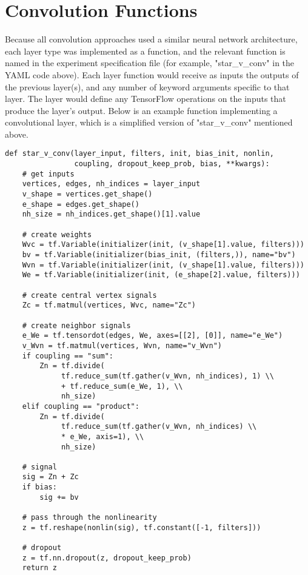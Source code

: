 \section{Convolution Functions}

Because all convolution approaches used a similar neural network architecture, each layer type was implemented as a function, and the relevant function is named in the experiment specification file (for example, "star\_v\_conv" in the YAML code above).
Each layer function would receive as inputs the outputs of the previous layer(s), and any number of keyword arguments specific to that layer.
The layer would define any TensorFlow operations on the inputs that produce the layer's output.
Below is an example function implementing a convolutional layer, which is a simplified version of "star\_v\_conv" mentioned above.

\begin{verbatim}
def star_v_conv(layer_input, filters, init, bias_init, nonlin, 
                coupling, dropout_keep_prob, bias, **kwargs):
    # get inputs 
    vertices, edges, nh_indices = layer_input
    v_shape = vertices.get_shape()
    e_shape = edges.get_shape()
    nh_size = nh_indices.get_shape()[1].value

    # create weights
    Wvc = tf.Variable(initializer(init, (v_shape[1].value, filters)))
    bv = tf.Variable(initializer(bias_init, (filters,)), name="bv")
    Wvn = tf.Variable(initializer(init, (v_shape[1].value, filters)))
    We = tf.Variable(initializer(init, (e_shape[2].value, filters)))

    # create central vertex signals
    Zc = tf.matmul(vertices, Wvc, name="Zc")

    # create neighbor signals
    e_We = tf.tensordot(edges, We, axes=[[2], [0]], name="e_We")
    v_Wvn = tf.matmul(vertices, Wvn, name="v_Wvn")
    if coupling == "sum":
        Zn = tf.divide(
             tf.reduce_sum(tf.gather(v_Wvn, nh_indices), 1) \\
             + tf.reduce_sum(e_We, 1), \\
             nh_size)
    elif coupling == "product":
        Zn = tf.divide(
             tf.reduce_sum(tf.gather(v_Wvn, nh_indices) \\
             * e_We, axis=1), \\
             nh_size)

    # signal
    sig = Zn + Zc
    if bias:
        sig += bv

    # pass through the nonlinearity
    z = tf.reshape(nonlin(sig), tf.constant([-1, filters]))
    
    # dropout
    z = tf.nn.dropout(z, dropout_keep_prob)
    return z

\end{verbatim}
